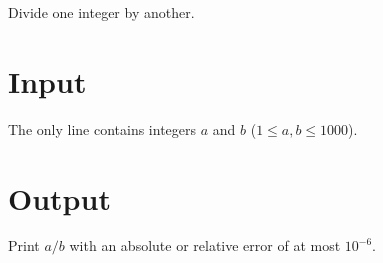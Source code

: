 
Divide one integer by another.

\section*{Input}
The only line contains integers $a$ and $b$ ($1 \le a, b \le 1000$).

\section*{Output}
Print $a / b$ with an absolute or relative error of at most $10^{-6}$.
